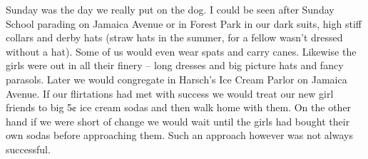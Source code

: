 \documentclass[12pt]{book}              %
\begin{document}
Sunday was the day we really put on the dog. I could be seen after Sunday School parading on Jamaica Avenue or in Forest Park in our dark suits, high stiff collars and derby hats (straw hats in the summer, for a fellow wasn't dressed without a hat). Some of us would even wear spats and carry canes. Likewise the girls were out in all their finery -- long dresses and big picture hats and fancy parasols. Later we would congregate in Harsch's Ice Cream Parlor on Jamaica Avenue. If our flirtations had met with success we would treat our new girl friends to big 5$\cent$ ice cream sodas and then walk home with them. On the other hand if we were short of change we would wait until the girls had bought their own sodas before approaching them. Such an approach however was not always successful. 
\end{document}
